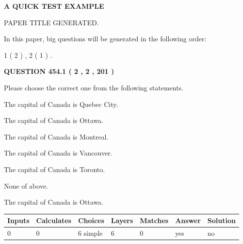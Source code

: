 \documentclass[12pt]{article}
\begin{document}
   
\vspace{0.2in}
   
   
   
   
   
   
   
   
 \vspace{0.2in}
{\LARGE {\textbf{ A QUICK TEST EXAMPLE}}}
   
   
 PAPER TITLE GENERATED.
   
   
   
\vspace{0.2in}
   
In this paper, big questions will be generated in the following order: 
   
   
   1 ( 2 )
 ,
   2 ( 1 )
 .
  
\vspace{0.2in}
  
{\textbf{\Large{QUESTION
454.1 
 ( 2 , 2 , 201 )
}}}
  
  
Please choose the correct one from the following statements.
 
 
The capital of Canada is Quebec City.
 
 
The capital of Canada is Ottawa.
 
 
The capital of Canada is Montreal.
 
 
The capital of Canada is Vancouver.
 
 
The capital of Canada is Toronto.
 
 
 None of above.
 
 
\noindent{}
 
 
The capital of Canada is Ottawa.
 
 
\noindent{}
 
 
   
   
   
   
\noindent\begin{tabular}{|l|l|l|l|l|l|l|}
 \hline
Inputs & Calculates & Choices & Layers & Matches & Answer & Solution \\ \hline
 0  & 
 0  & 
 6
  simple  
  & 
 6  & 
 0  & 
  yes & 
  no 
  \\ \hline
 \end{tabular}
   
\end{document}
